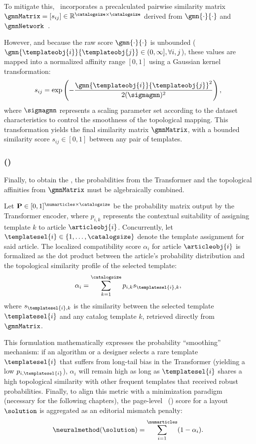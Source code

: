 To mitigate this, \neuralmethod\ incorporates a precalculated pairwise similarity matrix $\gmnMatrix = [s_{ij}] \in \mathbb{R}^{\catalogsize \times \catalogsize}$ derived from $\gmn{\cdot}{\cdot}$ and $\gmnNetwork$~\cite{patil_layoutgmn_2021, li-gmn-2019}.

However, and because the raw score $\gmn{\cdot}{\cdot}$ is unbounded ($\gmn{\templateobj{i}}{\templateobj{j}} \in (0, \infty], \forall i,j$), these values are mapped into a normalized affinity range $[0,1]$ using a Gaussian kernel transformation:
\begin{equation}
s_{ij} = \exp\left( -\frac{\gmn{\templateobj{i}}{\templateobj{j}}^2}{2(\sigmagmn)^2} \right),
\end{equation}
where $\sigmagmn$ represents a scaling parameter set according to the dataset characteristics to control the smoothness of the topological mapping. This transformation yields the final similarity matrix $\gmnMatrix$, with a bounded similarity score $s_{ij} \in [0, 1]$ between any pair of templates.

\subsubsection{\NeuralMethod (\neuralmethod)}

Finally, to obtain the \neuralmethod, the probabilities from the Transformer and the topological affinities from $\gmnMatrix$ must be algebraically combined. 

Let $\mathbf{P} \in [0,1]^{\numarticles \times \catalogsize}$ be the probability matrix output by the Transformer encoder, where $p_{i,k}$ represents the contextual suitability of assigning template $k$ to article $\articleobj{i}$. Concurrently, let $\templatesel{i} \in \{1, \dots, \catalogsize\}$ denote the  template assignment for said article. The localized compatibility score $\alpha_i$ for article $\articleobj{i}$ is formalized as the dot product between the article's probability distribution and the topological similarity profile of the selected template:
\begin{equation}
\alpha_i = \sum_{k=1}^{\catalogsize} p_{i,k} s_{\templatesel{i}, k},
\end{equation}
where $s_{\templatesel{i}, k}$ is the similarity between the selected template $\templatesel{i}$ and any catalog template $k$, retrieved directly from $\gmnMatrix$. 

This formulation mathematically expresses the probability ``smoothing'' mechanism: if an algorithm or a designer selects a rare template $\templatesel{i}$ that suffers from long-tail bias in the Transformer (yielding a low $p_{i,\templatesel{i}}$), $\alpha_i$ will remain high as long as $\templatesel{i}$ shares a high topological similarity with other frequent templates that received robust probabilities. Finally, to align this metric with a minimization paradigm (necessary for the following chapters), the page-level \NeuralMethod\ (\neuralmethod) score for a layout $\solution$ is aggregated as an editorial mismatch penalty:
\begin{equation}
\neuralmethod(\solution) = \sum_{i=1}^{\numarticles} (1 - \alpha_i).
\end{equation}

